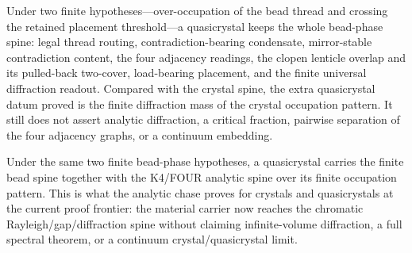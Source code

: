\begin{theorem}\label{thm:glass-bead-phase-quasicrystal-spine}\leanok{}
Under two finite hypotheses---over-occupation of the bead thread and crossing
the retained placement threshold---a quasicrystal keeps the whole bead-phase
spine: legal thread routing, contradiction-bearing condensate, mirror-stable
contradiction content, the four adjacency readings, the clopen lenticle overlap
and its pulled-back two-cover, load-bearing placement, and the finite universal
diffraction readout.  Compared with the crystal spine, the extra
quasicrystal datum proved is the finite diffraction mass of the crystal occupation
pattern.  It still does not assert analytic diffraction, a critical fraction,
pairwise separation of the four adjacency graphs, or a continuum embedding.
\end{theorem}

\begin{theorem}\label{thm:glass-quasicrystal-k4-analytic-spine}\leanok{}
Under the same two finite bead-phase hypotheses, a quasicrystal carries the
finite bead spine together with the K4/FOUR analytic spine over its finite
occupation pattern.  This is what the analytic chase proves for crystals and
quasicrystals at the current proof frontier: the material carrier now reaches
the chromatic Rayleigh/gap/diffraction spine without claiming infinite-volume
diffraction, a full spectral theorem, or a continuum crystal/quasicrystal
limit.
\end{theorem}

